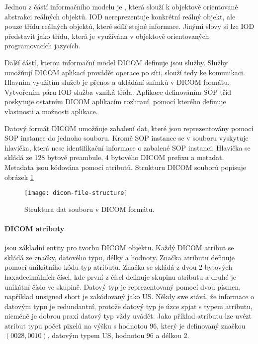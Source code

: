 Jednou z částí informačního modelu je , která slouží k objektově orientované abstrakci reálných objektů. IOD nereprezentuje konkrétní reálný objekt, ale pouze třídu reálných objektů, které sdílí stejné informace. Jinými slovy si lze IOD představit jako třídu, která je využívána v objektově orientovaných programovacích jazycích.

Další částí, kterou informační model DICOM definuje jsou služby. Služby umožňují DICOM aplikací provádět operace po síti, slouží tedy ke komunikaci. Hlavním využitím služeb je přenos a ukládání snímků v DICOM formátu. Vytvořením páru IOD-služba vzniká  třída. Aplikace definováním SOP tříd poskytuje ostatním DICOM aplikacím rozhraní, pomocí kterého definuje vlastnosti a možnosti aplikace. \cite{dicom-standard} 

Datový formát DICOM umožňuje zabalení dat, které jsou reprezentovány pomocí SOP instance do jednoho souboru. Kromě SOP instance se v souboru vyskytuje hlavička, která nese identifikační informace o zabalené SOP instanci. Hlavička se skládá ze 128 bytové preambule, 4 bytového DICOM prefixu a metadat. Metadata jsou kódována pomocí atributů. Strukturu DICOM souborů popisuje obrázek \ref{fig:dicom-file-structure}

\begin{figure}[htb]
\centering
\texttt{[image: dicom-file-structure]}
\caption{Struktura dat souboru v DICOM formátu. \cite{dicom-standard}}
\label{fig:dicom-file-structure}
\end{figure}

\paragraph{DICOM atributy} jsou základní entity pro tvorbu DICOM objektu. Každý DICOM atribut se skládá ze značky, datového typu, délky a hodnoty. Značka atributu definuje pomocí unikátního kódu typ atributu. Značka se skládá z dvou 2 bytových haxadecimálních čísel, kde první z čísel definuje skupinu atributu a druhé je unikátní číslo ve skupině. Datový typ je reprezentovaný pomocí dvou písmen, například unsigned short je zakódovaný jako US. Někdy swe stává, že informace o datovým typu je redundantní, protože datový typ je úzce spjat s typem atributu, nicméně je dobrou praxí datový typ vždy uvádět. Jako příklad atributu lze uvézt atribut typu počet pixelů na výšku s hodnotou 96, který je definovaný značkou $(0028, 0010)$, datovým typem US, hodnotou 96 a délkou 2.

